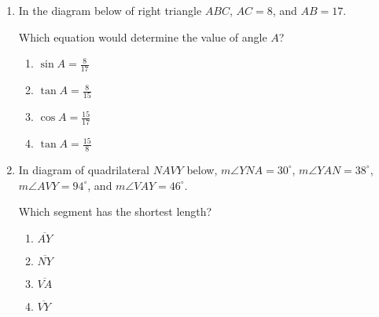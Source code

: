 \documentclass[12pt, oneside]{article}
\begin{document}
\begin{enumerate}[itemsep=2cm]
\item In the diagram below of right triangle $ABC$, $AC=8$, and $AB=17$.
  \begin{center}
  \end{center}
Which equation would determine the value of angle $A$?
  \begin{multicols}{2}
    \begin{enumerate}
      \item $\displaystyle \sin A = \frac{8}{17}$
      \item $\displaystyle \tan A = \frac{8}{15}$
      \item $\displaystyle \cos A = \frac{15}{17}$
      \item $\displaystyle \tan A = \frac{15}{8}$
    \end{enumerate}
  \end{multicols}

\newpage
\item In diagram of quadrilateral $NAVY$ below, $m\angle YNA = 30^\circ$, $m\angle YAN = 38^\circ$,\\ $m\angle AVY = 94^\circ$, and $m\angle VAY = 46^\circ$.
\begin{center}
  \end{center}
Which segment has the shortest length?
  \begin{multicols}{2}
  \begin{enumerate}
    \item $\overline{AY}$
    \item $\overline{NY}$
    \item $\overline{VA}$
    \item $\overline{VY}$
  \end{enumerate}
  \end{multicols}


\end{enumerate}
\end{document}
